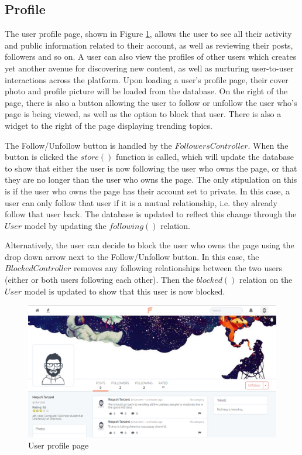 \subsection{Profile}
The user profile page, shown in Figure \ref{fig:ProfilePage}, allows the user to see all their activity and public information related to their account, as well as reviewing their posts, followers and so on. A user can also view the profiles of other users which creates yet another avenue for discovering new content, as well as nurturing user-to-user interactions across the platform. Upon loading a user's profile page, their cover photo and profile picture will be loaded from the database. On the right of the page, there is also a button allowing the user to follow or unfollow the user who's page is being viewed, as well as the option to block that user. There is also a widget to the right of the page displaying trending topics.

The Follow/Unfollow button is handled by the $FollowersController$. When the button is clicked the $store()$ function is called, which will update the database to show that either the user is now following the user who owns the page, or that they are no longer than the user who owns the page. The only stipulation on this is if the user who owns the page has their account set to private. In this case, a user can only follow that user if it is a mutual relationship, i.e. they already follow that user back. The database is updated to reflect this change through the $User$ model by updating the $following()$ relation.

Alternatively, the user can decide to block the user who owns the page using the drop down arrow next to the Follow/Unfollow button. In this case, the $BlockedController$ removes any following relationships between the two users (either or both users following each other). Then the $blocked()$ relation on the $User$ model is updated to show that this user is now blocked.

\begin{figure}[H]
\centering
\includegraphics[width=\textwidth]{Images/Implementation/ProfilePage}
\caption{User profile page}
\label{fig:ProfilePage}
\end{figure}

